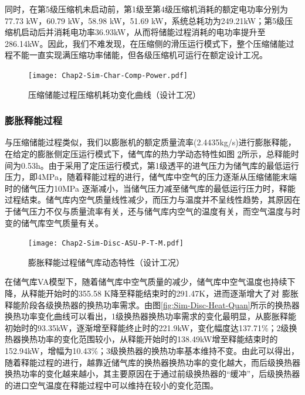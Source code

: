 同时，在第5级压缩机未启动前，第1级至第4级压缩机消耗的额定电功率分别为77.73 kW，60.79 kW，58.98 kW，51.69 kW，系统总耗功为249.21kW；第5级压缩机启动后并消耗电功率36.93kW，从而将储能过程消耗的电功率提升至286.14kW。因此，我们不难发现，在压缩侧的滑压运行模式下，整个压缩储能过程不能一直实现满压缩功率储能，但各级压缩机可运行在额定设计工况。

\begin{figure}[H] %
  \centering
  \texttt{[image: Chap2-Sim-Char-Comp-Power.pdf]}
  \caption{压缩储能过程压缩机耗功变化曲线（设计工况）}
  \label{fig:Sim-Char-Comp-Power}
\end{figure}

\subsubsection{膨胀释能过程}
与压缩储能过程类似，我们以膨胀机的额定质量流率(2.4435kg/s)进行膨胀释能，在给定的膨胀侧定压运行模式下，储气库的热力学动态特性如图
\ref{fig:Sim-Disc-ASU-P-T-M}所示，总释能时间为0.53h。由于采用了定压运行模式，第1级透平的进气压力为储气库的最低运行压力，即4MPa，随着释能过程的进行，储气库中空气的压力逐渐从压缩储能末端时的储气压力10MPa 逐渐减小，当储气压力减至储气库的最低运行压力时，释能过程结束。储气库内空气质量线性减少，而压力与温度并不呈线性趋势，其原因在于储气压力不仅与质量流率有关，还与储气库内空气的温度有关，而空气温度与时变的储气库空气质量有关。

\begin{figure}[H] %
  \centering
  \texttt{[image: Chap2-Sim-Disc-ASU-P-T-M.pdf]}
  \caption{膨胀释能过程储气库动态特性（设计工况）}
  \label{fig:Sim-Disc-ASU-P-T-M}
\end{figure}

在储气库VA模型下，随着储气库中空气质量的减少，储气库中空气温度也持续下降，从释能开始时的355.58 K降至释能结束时的291.47K，进而逐渐增大了对
膨胀释能阶段各级换热器的换热功率需求。由图\ref{fig:Sim-Disc-Heat-Quan}所示的换热器换热功率变化曲线可以看出，1级换热器换热功率需求的变化最明显，从膨胀释能初始时的93.35kW，逐渐增至释能终止时的221.9kW，变化幅度达137.71\%；2级换热器换热功率的变化范围较小，从释能开始时的138.49kW增至释能结束时的152.94kW，增幅为10.43\%；3级换热器的换热功率基本维持不变。由此可以得出，随着释能过程的进行，越靠近储气库的换热器换热功率的变化越大，而后级换热器换热功率的变化越来越小，其主要原因在于通过前级换热器的“缓冲”，后级换热器的进口空气温度在释能过程中可以维持在较小的变化范围。

